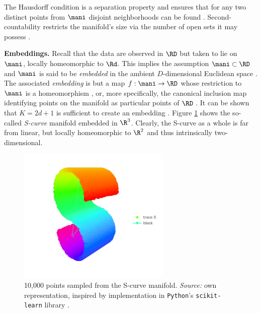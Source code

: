 The Hausdorff condition is a separation property and ensures that for any two 
distinct points from $\mani$ disjoint neighborhoods can be found 
\citep{brown2006}.
Second-countability restricts the manifold's size via the number of open sets 
it may possess \citep{waldmann2014}.
\\

\vspace{0.5cm}


\begin{minipage}[b]{0.5\textwidth}
  \textbf{Embeddings.} Recall that the data are observed in $\RD$ but taken to 
  lie on $\mani$, locally homeomorphic to $\Rd$.
  This implies the assumption $\mani \subset \RD$ and $\mani$ is said to be 
  \textit{embedded} in the ambient $D$-dimensional Euclidean space 
  \citep{cayton2005}.
  The associated \textit{embedding} is but a map $f: \mani \rightarrow \RD$ 
  whose restriction to $\mani$ is a homeomorphism \citep{brown2006}, or, more 
  specifically, the canonical inclusion map identifying points on the manifold 
  as particular points of $\RD$ \citep{waldmann2014}.
  It can be shown that $K = 2d + 1$ is sufficient to create an embedding 
  \citep{mafu2011}.
  Figure \ref{fig:scurve} shows the so-called \textit{S-curve} manifold 
  embedded in $\R^3$.
  Clearly, the S-curve as a whole is far from linear, but locally homeomorphic 
  to $\R^2$ and thus intrinsically two-dimensional.
\end{minipage}
\begin{minipage}[b]{0.05\textwidth}
  \phantom{xxx}
\end{minipage}
\begin{minipage}[b]{0.45\textwidth}
  \begin{figure}[H]
    \centering
    \includegraphics[trim = 100 20 70 30, clip, %
      width = 0.65\textwidth]{figures/s-curve}
    \caption[S-curve manifold]{10,000 points sampled from the S-curve manifold. 
    \textit{Source:} own representation, inspired by implementation in 
    \texttt{Python}'s \texttt{scikit-learn} library \citep{scikit-learn}.}
    \label{fig:scurve}
  \end{figure}
\end{minipage}

